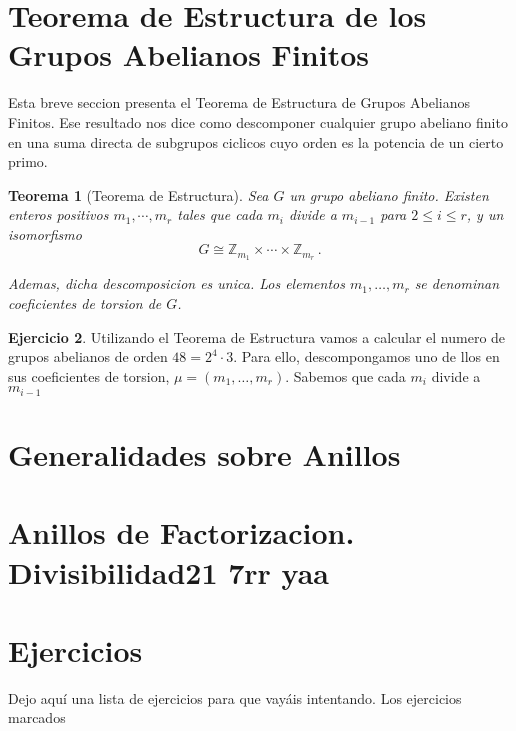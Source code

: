 \documentclass[a4paper,11pt]{amsart}
\theoremstyle{plain}
\newtheorem{thm}{Teorema}[section]
\theoremstyle{definition}
\newtheorem{ejercicio}[thm]{Ejercicio}
\theoremstyle{remark}
\begin{document}
\section{Teorema de Estructura de los Grupos Abelianos Finitos}

Esta breve seccion presenta el Teorema de Estructura de Grupos Abelianos Finitos. Ese resultado nos dice como descomponer cualquier grupo abeliano finito en una suma directa de subgrupos ciclicos cuyo orden es la potencia de un cierto primo. 

\begin{thm}[Teorema de Estructura]
Sea $G$ un grupo abeliano finito. Existen enteros positivos $m_1, \cdots, m_r$ tales que cada $m_i$ divide a $m_{i-1}$ para $2 \leq i \leq r$, y un isomorfismo 
$$ G \cong \mathbb{Z}_{m_1} \times \cdots \times \mathbb{Z}_{m_r} \, .$$

Ademas, dicha descomposicion es unica. Los elementos $m_1, \dots , m_r$ se denominan \textit{coeficientes de torsion de $G$}.
\end{thm}


\begin{ejercicio}
Utilizando el Teorema de Estructura vamos a calcular el numero de grupos abelianos de orden $48 = 2^4 \cdot 3$. Para ello, descompongamos uno de llos en sus coeficientes de torsion, $\mu = (m_1, \dots , m_r)$. Sabemos que cada $m_i$ divide a $m_{i-1}$
\end{ejercicio}

\section{Generalidades sobre Anillos}



\section{Anillos de Factorizacion. Divisibilidad21 7rr yaa}

\section{Ejercicios}

Dejo aquí una lista de ejercicios para que vayáis intentando. Los ejercicios marcados 
\end{document}
